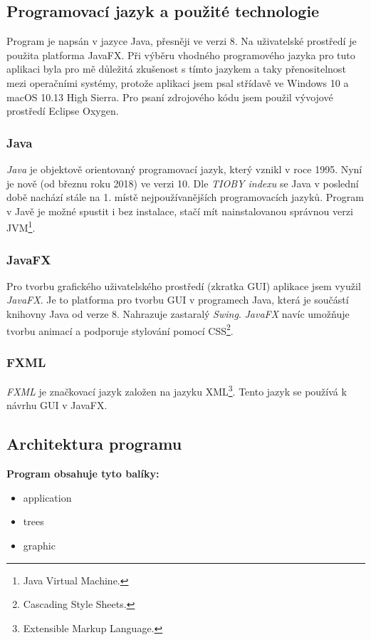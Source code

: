\documentclass[
  biblatex=false,
  font=serif,
  glossaries=false,
  tables=false,
  theorems=false,
  index
]{kidiplom}
\begin{document}
\subsection{Programovací jazyk a použité technologie}
\indent\indent Program je napsán v jazyce Java, přesněji ve verzi 8. Na uživatelské prostředí je použita platforma JavaFX. Při výběru vhodného programového jazyka pro tuto aplikaci byla pro mě důležitá zkušenost s tímto jazykem a taky přenositelnost mezi operačními systémy, protože aplikaci jsem psal střídavě ve Windows 10 a macOS 10.13 High Sierra. Pro psaní zdrojového kódu jsem použil vývojové prostředí Eclipse Oxygen.

\subsubsection{Java}
\indent\indent \textit{Java} je objektově orientovaný programovací jazyk, který vznikl v roce 1995. Nyní je nově (od březnu roku 2018) ve verzi 10. Dle \textit{TIOBY indexu} se Java v poslední době nachází stále na 1. místě nejpoužívanějších programovacích jazyků.\cite{tioby} Program v Javě je možné spustit i bez instalace, stačí mít nainstalovanou správnou verzi JVM\footnote{Java Virtual Machine.}.

\subsubsection{JavaFX}
\indent\indent Pro tvorbu grafického uživatelského prostředí (zkratka GUI) aplikace jsem využil \textit{JavaFX}. Je to platforma pro tvorbu GUI v programech Java, která je součástí knihovny Java od verze 8. Nahrazuje zastaralý \textit{Swing}. \textit{JavaFX} navíc umožňuje tvorbu animací a podporuje stylování pomocí CSS\footnote{Cascading Style Sheets.}. 

\subsubsection{FXML}
\indent\indent\textit{FXML} je značkovací jazyk založen na jazyku \textsc{XML}\footnote{Extensible Markup Language.}. Tento jazyk se používá k návrhu GUI v JavaFX.

\subsection{Architektura programu}

\noindent \textbf{Program obsahuje tyto balíky:}
\begin{itemize}
\item application
\item trees
\item graphic
\end{itemize}
\end{document}
